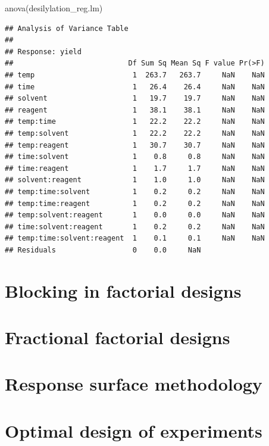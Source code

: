 \documentclass[
]{book}
\newenvironment{Shaded}{\begin{snugshade}}{\end{snugshade}}
\newcommand{\FunctionTok}[1]{\textcolor[rgb]{0.00,0.00,0.00}{#1}}
\newcommand{\NormalTok}[1]{#1}
\theoremstyle{definition}
\theoremstyle{definition}
\theoremstyle{definition}
\theoremstyle{definition}
\theoremstyle{remark}
\begin{document}
\begin{Shaded}
\begin{Highlighting}[]
\FunctionTok{anova}\NormalTok{(desilylation\_reg.lm)}
\end{Highlighting}
\end{Shaded}

\begin{verbatim}
## Analysis of Variance Table
## 
## Response: yield
##                           Df Sum Sq Mean Sq F value Pr(>F)
## temp                       1  263.7   263.7     NaN    NaN
## time                       1   26.4    26.4     NaN    NaN
## solvent                    1   19.7    19.7     NaN    NaN
## reagent                    1   38.1    38.1     NaN    NaN
## temp:time                  1   22.2    22.2     NaN    NaN
## temp:solvent               1   22.2    22.2     NaN    NaN
## temp:reagent               1   30.7    30.7     NaN    NaN
## time:solvent               1    0.8     0.8     NaN    NaN
## time:reagent               1    1.7     1.7     NaN    NaN
## solvent:reagent            1    1.0     1.0     NaN    NaN
## temp:time:solvent          1    0.2     0.2     NaN    NaN
## temp:time:reagent          1    0.2     0.2     NaN    NaN
## temp:solvent:reagent       1    0.0     0.0     NaN    NaN
## time:solvent:reagent       1    0.2     0.2     NaN    NaN
## temp:time:solvent:reagent  1    0.1     0.1     NaN    NaN
## Residuals                  0    0.0     NaN
\end{verbatim}

\hypertarget{block-factorial}{%
\chapter{Blocking in factorial designs}\label{block-factorial}}

\hypertarget{fractional-factorial}{%
\chapter{Fractional factorial designs}\label{fractional-factorial}}

\hypertarget{response-surface-methodology}{%
\chapter{Response surface methodology}\label{response-surface-methodology}}

\hypertarget{optimal-design-of-experiments}{%
\chapter{Optimal design of experiments}\label{optimal-design-of-experiments}}

  
\end{document}

